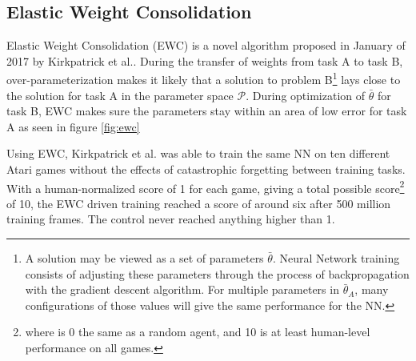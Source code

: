 \subsection{Elastic Weight Consolidation}
Elastic Weight Consolidation (EWC) is a novel algorithm proposed in January of 2017 by Kirkpatrick et al.\cite{ewc}. During the transfer of weights from task A to task B, over-parameterization makes it likely that a solution to problem B\footnote{A solution may be viewed as a set of parameters \(\bar{\theta}\). Neural Network training consists of adjusting these parameters through the process of backpropagation with the gradient descent algorithm. For multiple parameters in \(\bar{\theta}_{A}\), many configurations of those values will give the same performance for the NN.} lays close to the solution for task A in the parameter space \(\mathcal{P}\). During optimization of \(\bar{\theta}\) for task B, EWC makes sure the parameters stay within an area of low error for task A as seen in figure \ref{fig:ewc}

Using EWC, Kirkpatrick et al.\cite{ewc} was able to train the same NN on ten different Atari games without the effects of catastrophic forgetting between training tasks. With a human-normalized score of 1 for each game, giving a total possible score\footnote{where is 0 the same as a random agent, and 10 is at least human-level performance on all games.} of 10, the EWC driven training reached a score of around six after 500 million training frames. The control 
 never reached anything higher than 1.

